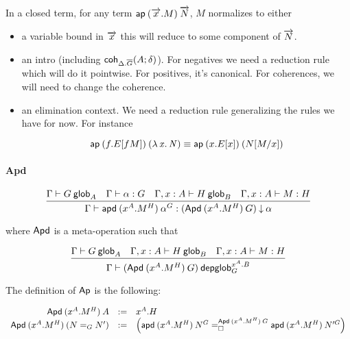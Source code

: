 In a closed term, for any term $\ap{(\tel{x}.M)}{\tel{N}}$, $M$ normalizes to
either
\begin{itemize}
\item a variable bound in $\tel{x}$ this will reduce to some component of
  $\tel{N}$.
\item an intro (including $\coh{\Delta.\diag G}{A}{\delta}$). For negatives we
  need a reduction rule which will do it pointwise. For positives, it’s
  canonical. For coherences, we will need to change the coherence.
\item an elimination context. We need a reduction rule generalizing the rules we
  have for now. For instance

\[\ap{(f.E[f M])}{(\ulam{x}{N})} \equiv \ap{(x.E[x])}{(\subst{N}{M}{x})}\]

\end{itemize}



\paragraph{Apd}

\begin{small}
  \[\infer{\ofdepglob{\Gamma}{\apd{(x^A.M^H)}{\alpha^G}}
    {(\Apd{(x^A.M^H)}{G})}{\alpha}}
  {\wfglob{\Gamma}{G}{A}
    & \ofglob{\Gamma}{\alpha}{G}
    & \wfglob{\Gamma,x:A}{H}{B}
    & \ofglob{\Gamma,x:A}{M}{H}}\]

  where $\dsd{Apd}$ is a meta-operation such that

  \[\infer{\wfdepglob{\Gamma}{(\Apd{(x^A.M^H)}{G})}
    {x^A.B}{G}}
  {\wfglob{\Gamma}{G}{A}
    & \wfglob{\Gamma,x:A}{H}{B}
    & \ofglob{\Gamma,x:A}{M}{H}}\]

  The definition of $\dsd{Ap}$ is the following:

  \[
  \begin{array}{rcl}
    \Apd{(x^A.M^H)}{A} & := & x^A.H \\
    \Apd{(x^A.M^H)}{(\homj{G}{N}{N'})} & := & \left(
      \dhomj{\Apd{(x^A.M^H)}{G}}
      {\apd{(x^A.M^H)}{N^G}}{\apd{(x^A.M^H)}{N'^G}}{\blank}\right)
  \end{array}
  \]
\end{small}


